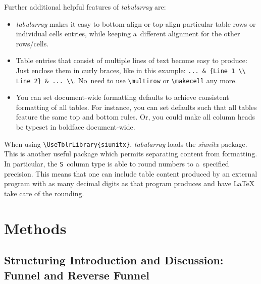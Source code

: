 Further additional helpful features of \mbox{\textit{tabularray}} are:
\begin{itemize}
	\item \mbox{\textit{tabularray}} makes it easy to bottom-align or top-align particular table rows or individual cells entries, while keeping a~different alignment for the other rows\slash cells.
	\item Table entries that consist of multiple lines of text become easy to produce: Just enclose them in curly braces, like in this example: \verb|... & {Line 1 \\ Line 2} & ... \\|. No~need to use \verb|\multirow| or \verb|\makecell| any more.
	\item You can set document-wide formatting defaults to achieve consistent formatting of all tables. For instance, you can set defaults such that all tables feature the same top and bottom rules. Or, you could make all column heads be typeset in boldface document-wide.
\end{itemize}

When using \verb|\UseTblrLibrary{siunitx}|, \mbox{\textit{tabularray}} loads the \mbox{\textit{siunitx}} package. This is another useful package which permits separating content from formatting. In particular, the \verb|S|~column type is able to round numbers to a~specified precision. This means that one can include table content produced by an external program with as many decimal digits as that program produces and have LaTeX take care of the rounding.


\section{Methods}
\label{sec:Methods}

\subsection{Structuring Introduction and Discussion: Funnel and Reverse Funnel}

